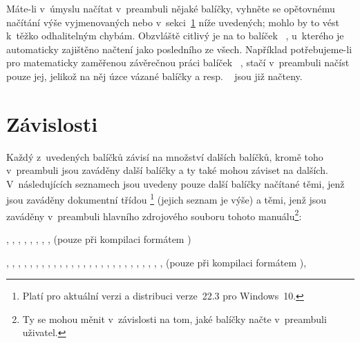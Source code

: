 \noindent
Máte-li v~úmyslu načítat v~preambuli nějaké balíčky, vyhněte se opětovnému
načítání výše vyjmenovaných nebo v~sekci~\ref{dependencies} níže uvedených;
mohlo by to vést k~těžko odhalitelným chybám. Obzvláště citlivý je na to
balíček ~\cite{LtX:LIVE:CTAN:hyperref}, u~kterého je automaticky
zajištěno načtení jako posledního ze všech. Například potřebujeme-li pro
matematicky zaměřenou závěrečnou práci balíček
~\cite{AMS:LIVE:CTAN:AMSthm}, stačí v~preambuli načíst pouze jej,
jelikož na něj úzce vázané balíčky  a 
resp. ~\cite{LtX:LIVE:CTAN:AMSmath,%
  AMS:LIVE:CTAN:AMSfonts} jsou již načteny.

\section{Závislosti}\label{dependencies}%

Každý z~uvedených balíčků závisí na množství dalších balíčků, kromě toho
v~preambuli jsou zaváděny další balíčky a ty také mohou záviset na
dalších. V~následujících seznamech jsou uvedeny pouze další balíčky načítané
těmi, jenž jsou zaváděny dokumentní třídou \footnote{Platí
  pro aktuální verzi \pkg{\ipotname} a distribuci \distroMiKTeX{} verze~22.3
  pro Windows~10.}  (jejich seznam je výše) a těmi, jenž jsou zaváděny
v~preambuli hlavního zdrojového souboru  tohoto
manuálu\footnote{Ty se mohou měnit v~závislosti na tom, jaké balíčky načte
  v~preambuli uživatel.}:

\begin{description*}
\raggedright
\item[Bez volby \opt{htext} (viz s.~\pageref{opthtext}):]
,
,
,
,
,
,
,
,
 (pouze při kompilaci formátem )
\item[S~volbou \opt{htext}:]
,
,
,
,
,
,
,
,
,
,
,
,
,
,
,
,
,
,
,
,
,
,
,
,
,
,
,
 (pouze při kompilaci formátem ),
\end{description*}

\endinput


